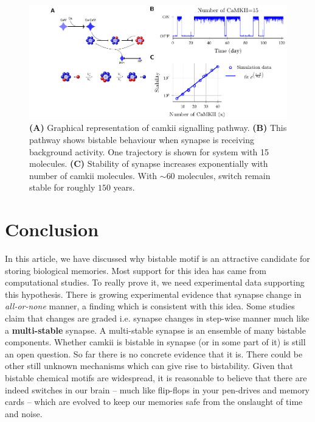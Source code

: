 \documentclass[]{resonance}
\begin{document}
\begin{figure}[h!]
    \caption{ \textbf{(A)} Graphical representation of \gls{camkii} signalling
        pathway. \textbf{(B)} This pathway shows bistable behaviour when synapse
        is receiving background activity. One trajectory is shown for system with 
        15 molecules. \textbf{(C)} Stability of synapse increases exponentially
        with number of \gls{camkii} molecules. With $\sim 60$ molecules, switch
        remain stable for roughly $150$ years.
    }\label{fig:camkii_summary}
    \centering
    \includegraphics[width=\linewidth]{./resonance_camkii.pdf}
\end{figure}


\section{Conclusion}

In this article, we have discussed why bistable motif is an attractive candidate
for storing biological memories. Most support for this idea has came from
computational studies. To really prove it, we need experimental data supporting
this hypothesis. There is growing experimental evidence that synapse change in
\textit{all-or-none} manner, a finding which is consistent with this idea. Some
studies claim that changes are graded i.e. synapse changes in step-wise manner
much like a \textbf{multi-stable} synapse. A multi-stable synapse is an ensemble
of many bistable components. Whether \gls{camkii} is bistable in synapse (or in
some part of it) is still an open question. So far there is no concrete evidence
that it is. There could be other still unknown mechanisms which can give rise to
bistability. Given that bistable chemical motifs are widespread, it is
reasonable to believe that there are indeed switches in our brain -- much like
flip-flops in your pen-drives and memory cards -- which are evolved to keep our
memories safe from the onslaught of time and noise.
\end{document}
